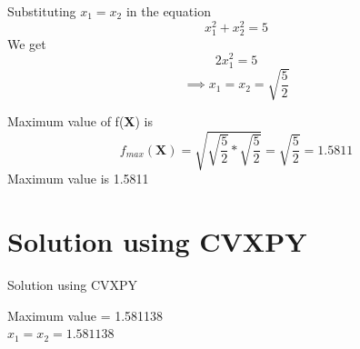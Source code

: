 \documentclass{beamer}
\begin{document}
\begin{frame}
Substituting $x_{1} = x_{2}$ in the equation
\begin{equation}
 x_{1}^{2} + x_{2}^{2} = 5
\end{equation}
We get
\begin{equation*}
    2x_{1}^{2} = 5
\end{equation*}
\begin{equation*}
\implies x_{1}=x_{2}=\displaystyle\sqrt{\frac{5}{2}}
\end{equation*}

Maximum value of f(\textbf{X}) is
\begin{equation*}
   \displaystyle f_{max}(\textbf{X})=\sqrt{\sqrt{\frac{5}{2}}*\sqrt{\frac{5}{2}}} = \sqrt{\frac{5}{2}} = 1.5811 
\end{equation*}
Maximum value is 1.5811
\end{frame}

\section{Solution using CVXPY}

\begin{frame}{Solution using CVXPY}


Maximum value = 1.581138\\
$x_{1} = x_{2} = 1.581138$
\end{frame}
\end{document}
